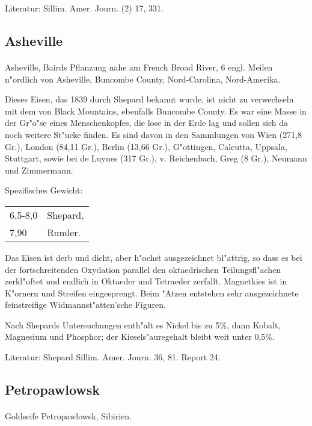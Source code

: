 \documentclass[a4paper, 11pt, oneside]{article}
\begin{document}
\footnotesize
Literatur: Sillim. Amer. Journ. (2) 17, 331.

\subsection{Asheville}
\normalsize
\paragraph{}
Asheville, Bairds Pflanzung nahe am French Broad River, 6 engl. Meilen n"ordlich von Asheville, Buncombe County, Nord-Carolina, Nord-Amerika.

Dieses Eisen, das 1839 durch Shepard bekannt wurde, ist nicht zu verwechseln mit dem von Black Mountains, ebenfalls Buncombe County. Es war eine Masse in der Gr"o"se eines Menschenkopfes, die lose in der Erde lag und sollen sich da noch weitere St"ucke finden. Es sind davon in den Sammlungen von Wien (271,8 Gr.), London (84,11 Gr.), Berlin (13,66 Gr.), G"ottingen, Calcutta, Uppsala, Stuttgart, sowie bei de Luynes (317 Gr.), v. Reichenbach, Greg (8 Gr.), Neumann und Zimmermann.

Spezifisches Gewicht:  
\begin{table}[!ht]
    \centering
    \begin{tabular}{l l}
        6,5-8,0 & Shepard,\\
        7,90 & Rumler.
    \end{tabular}
\end{table}

Das Eisen ist derb und dicht, aber h"ochst ausgezeichnet bl"attrig, so dass es bei der fortschreitenden Oxydation parallel den oktaedrischen Teilungsfl"achen zerkl"uftet und endlich in Oktaeder und Tetraeder zerfallt. Magnetkies ist in K"ornern und Streifen eingesprengt. Beim "Atzen entstehen sehr ausgezeichnete feinstreifige Widmannst"atten'sche Figuren.

Nach Shepards Untersuchungen enth"alt es Nickel bis zu 5\%, dann Kobalt, Magnesium und Phosphor; der Kiesels"auregehalt bleibt weit unter 0,5\%.

\footnotesize
Literatur: Shepard Sillim. Amer. Journ. 36, 81. Report 24.

\subsection{Petropawlowsk}
\normalsize
\paragraph{}
Goldseife Petropawlowsk, Sibirien.
\end{document}
